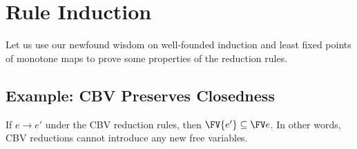 \section{Rule Induction}

Let us use our newfound wisdom on well-founded induction and least fixed points of monotone maps to prove some properties of the reduction rules.

\subsection{Example: CBV Preserves Closedness}

\begin{theorem}
\label{thm:CBVpreservesclosedness}
If $e\rightarrow e'$ under the CBV reduction rules, then $\FV{e'}\subseteq\FV e$. In other words, CBV reductions cannot introduce any new free variables.
\end{theorem}

